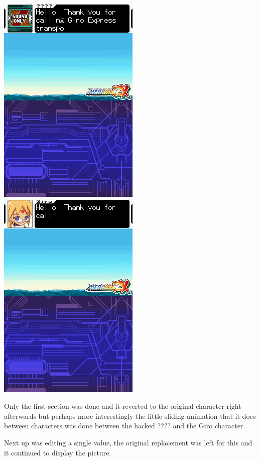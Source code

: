 \documentclass[
]{book}
\begin{document}
\includegraphics{images/106_home_fast6191_romhackingguide_unrenamed_fil___iginal_borders_romhackingguidemarkupexedit1.png}\includegraphics{images/107_home_fast6191_romhackingguide_unrenamed_fil___iginal_borders_romhackingguidemarkupexedit2.png}

Only the first section was done and it reverted to the original character right afterwards but perhaps more interestingly the little sliding animation that it does between characters was done between the hacked ???? and the Giro character.

Next up was editing a single value, the original replacement was left for this and it continued to display the picture.
\end{document}
